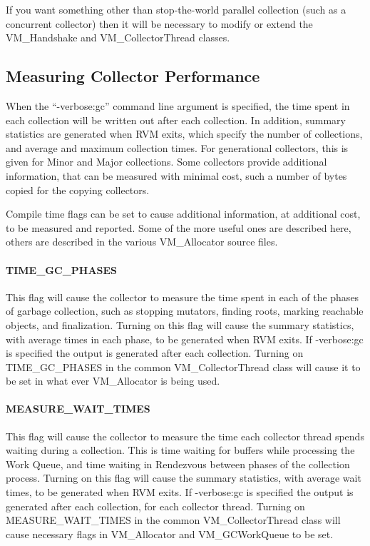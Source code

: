 If you want something other than stop-the-world parallel collection 
(such as a concurrent collector) then it will be necessary to modify
or extend the VM\_Handshake and VM\_CollectorThread classes.

\subsection{Measuring Collector Performance} \label{sssec:verbosegc}
When the ``-verbose:gc'' command line argument is specified, the time
spent in each collection will be written out after each collection.
In addition, summary statistics are generated when RVM exits, which
specify the number of collections, and average and maximum collection times.
For generational collectors, this is given for Minor and Major collections.
Some collectors provide additional information, that can be measured
with minimal cost, such a number of bytes copied for the copying collectors.

Compile time flags can be set to cause additional information, at additional
cost, to be measured and reported.  Some of the more useful ones are
described here, others are described in the various VM\_Allocator
source files.

\paragraph{TIME\_GC\_PHASES}
This flag will cause the collector to measure the time spent in each
of the phases of garbage collection, such as stopping mutators, finding roots,
marking reachable objects, and finalization.  Turning on this flag will cause
the summary statistics, with average times in each phase, to be generated 
when RVM exits.  If -verbose:gc is specified the output is generated after
each collection. Turning on TIME\_GC\_PHASES in the common VM\_CollectorThread
class will cause it to be set in what ever VM\_Allocator is being used.

\paragraph{MEASURE\_WAIT\_TIMES}
This flag will cause the collector to measure the time each collector thread
spends waiting during a collection.  This is time waiting for buffers while
processing the Work Queue, and time waiting in Rendezvous between phases of the
collection process. Turning on this flag will cause
the summary statistics, with average wait times, to be generated 
when RVM exits.  If -verbose:gc is specified the output is generated after
each collection, for each collector thread.
Turning on MEASURE\_WAIT\_TIMES in the common VM\_CollectorThread
class will cause necessary flags in VM\_Allocator and VM\_GCWorkQueue to be set.

